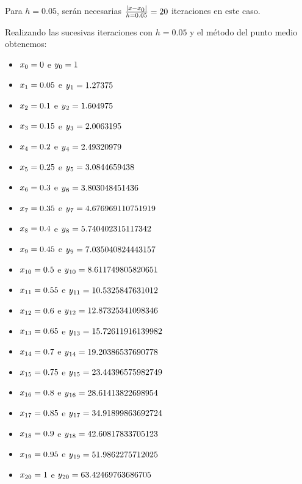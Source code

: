 \documentclass[paper=a4, fontsize=11pt]{scrartcl} %
\numberwithin{equation}{section}
\begin{document}
	
	Para $h = 0.05$, serán necesarias $\frac{|x - x\textsubscript{0}|}{h = 0.05} = 20$ iteraciones en este caso.
	
	Realizando las sucesivas iteraciones con $h = 0.05$ y el método del punto medio obtenemos:
	\begin{itemize}
		\item $x\textsubscript{0} = 0$ e $y\textsubscript{0} = 1$
		\item $x\textsubscript{1} = 0.05$ e $y\textsubscript{1} = 1.27375$
		\item $x\textsubscript{2} = 0.1$ e $y\textsubscript{2} = 1.604975$
		\item $x\textsubscript{3} = 0.15$ e $y\textsubscript{3} = 2.0063195$
		\item $x\textsubscript{4} = 0.2$ e $y\textsubscript{4} = 2.49320979$
		\item $x\textsubscript{5} = 0.25$ e $y\textsubscript{5} = 3.0844659438$
		\item $x\textsubscript{6} = 0.3$ e $y\textsubscript{6} = 3.803048451436$
		\item $x\textsubscript{7} = 0.35$ e $y\textsubscript{7} = 4.676969110751919$
		\item $x\textsubscript{8} = 0.4$ e $y\textsubscript{8} = 5.740402315117342$
		\item $x\textsubscript{9} = 0.45$ e $y\textsubscript{9} = 7.035040824443157$
		\item $x\textsubscript{10} = 0.5$ e $y\textsubscript{10} = 8.611749805820651$
		\item $x\textsubscript{11} = 0.55$ e $y\textsubscript{11} = 10.5325847631012$
		\item $x\textsubscript{12} = 0.6$ e $y\textsubscript{12} = 12.87325341098346$
		\item $x\textsubscript{13} = 0.65$ e $y\textsubscript{13} = 15.72611916139982$
		\item $x\textsubscript{14} = 0.7$ e $y\textsubscript{14} = 19.20386537690778$
		\item $x\textsubscript{15} = 0.75$ e $y\textsubscript{15} = 23.44396575982749$
		\item $x\textsubscript{16} = 0.8$ e $y\textsubscript{16} = 28.61413822698954$
		\item $x\textsubscript{17} = 0.85$ e $y\textsubscript{17} = 34.91899863692724$
		\item $x\textsubscript{18} = 0.9$ e $y\textsubscript{18} = 42.60817833705123$
		\item $x\textsubscript{19} = 0.95$ e $y\textsubscript{19} = 51.9862275712025$
		\item $x\textsubscript{20} = 1$ e $y\textsubscript{20} = 63.42469763686705$
	\end{itemize}
	
\end{document}
